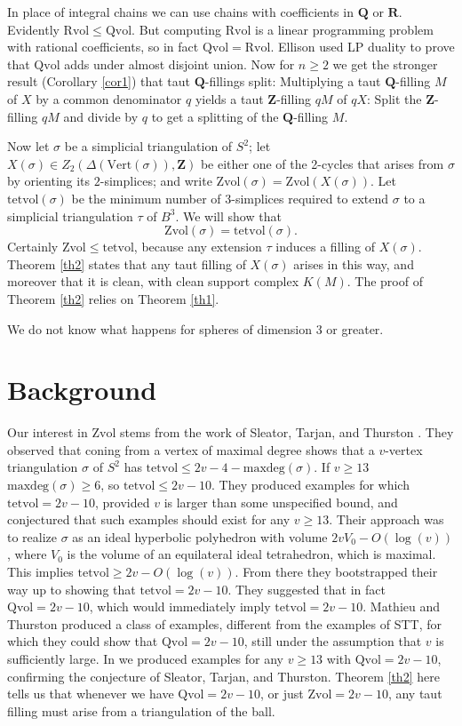\documentclass[12pt]{article}
\def\ZZ{\mathbf{Z}}
\def\QQ{\mathbf{Q}}
\def\RR{\mathbf{R}}
\newcommand{\kw}{\mathrm}
\newcommand{\maxdeg}{\kw{maxdeg}}
\newcommand{\vertices}{\kw{Vert}}
\newcommand{\Zvol}{\kw{Zvol}}
\newcommand{\Qvol}{\kw{Qvol}}
\newcommand{\Rvol}{\kw{Rvol}}
\newcommand{\tetvol}{\kw{tetvol}}
\begin{document}
In place of integral chains we can use chains with
coefficients in $\QQ$ or $\RR$.
Evidently $\Rvol \leq \Qvol$.
But computing $\Rvol$ is
a linear programming problem with rational coefficients,
so in fact $\Qvol = \Rvol$.
Ellison used LP duality to prove that
$\Qvol$ adds under almost
disjoint union.
Now for $n \geq 2$ we get the stronger result
(Corollary \ref{cor1})
that taut $\QQ$-fillings split:
Multiplying a taut
$\QQ$-filling $M$ of $X$ by a common denominator $q$
yields a taut $\ZZ$-filling $qM$ of $qX$:
Split the $\ZZ$-filling $qM$ and divide by $q$ to get a splitting
of the $\QQ$-filling $M$.

Now let $\sigma$ be a simplicial triangulation of $S^2$;
let $X(\sigma) \in Z_2(\Delta(\vertices(\sigma)),\ZZ)$
be either one of the 2-cycles
that arises from $\sigma$ by orienting its $2$-simplices;
and write $\Zvol(\sigma) = \Zvol(X(\sigma))$.
Let $\tetvol(\sigma)$ be the minimum number of $3$-simplices
required to extend $\sigma$ to a simplicial triangulation $\tau$ of $B^3$.
We will show that
\[
\Zvol(\sigma) = \tetvol(\sigma)
.
\]
Certainly $\Zvol \leq \tetvol$,
because any extension $\tau$ induces a filling
of $X(\sigma)$.
Theorem \ref{th2} states that
any taut filling of $X(\sigma)$ arises in this way, and moreover that it
is clean, with clean support complex $K(M)$.
The proof of Theorem \ref{th2} relies on Theorem \ref{th1}.

We do not know what happens for spheres of dimension 3 or greater.

\section{Background}

Our interest in $\Zvol$ stems from the work
of Sleator, Tarjan, and Thurston
\cite{stt:jams}.
They observed that coning from a vertex of maximal degree
shows that a $v$-vertex
triangulation $\sigma$
of $S^2$ has $\tetvol \leq 2v-4-\maxdeg(\sigma)$.
If $v\geq13$ $\maxdeg(\sigma) \geq 6$, so $\tetvol \leq 2v-10$.
They
produced examples for which $\tetvol = 2v-10$, provided
$v$ is larger than some unspecified bound,
and conjectured that such examples should exist for any $v \geq 13$.
Their approach was to 
realize $\sigma$ as an ideal hyperbolic polyhedron
with volume $2v V_0-O(\log(v))$,
where $V_0$ is the volume of an
equilateral ideal tetrahedron,
which is maximal.
This implies $\tetvol \geq 2v-O(\log(v))$.
From there they bootstrapped their way up to showing
that $\tetvol=2v-10$.
They suggested
\cite[p. 697]{stt:jams}
that in fact $\Qvol= 2v-10$,
which would immediately imply $\tetvol=2v-10$.
Mathieu and Thurston \cite{mt}
produced a class of examples,
different from the examples of STT,
for which they could show that $\Qvol = 2v-10$,
still under the assumption that $v$
is sufficiently large.
In \cite{dew:filling} we produced examples for any $v \geq 13$ with
$\Qvol=2v-10$, confirming the conjecture of Sleator, Tarjan, and Thurston.
Theorem \ref{th2} here
tells us that whenever we have $\Qvol=2v-10$,
or just $\Zvol=2v-10$, any taut filling
must arise from a triangulation of the ball.
\end{document}

